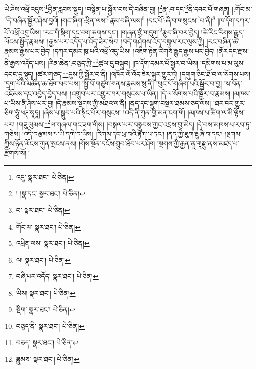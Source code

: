 ཡེ་ཤེས་འཕྲོ་འདུས་\footnote{འདུ་  སྣར་ཐང་།  པེ་ཅིན། }བྱིན་རླབས་སྡུད། །བསྙེན་པ་སྐྱོལ་བས་དེ་བཞིན་བྱ། །\footnote{། །སྣ་དང་  སྣར་ཐང་།  པེ་ཅིན། }རྣ་:བ་དང་\footnote{བ་  སྣར་ཐང་།  པེ་ཅིན། }ནི་དབང་པོ་གཞན། །:གོང་མ་\footnote{གོང་ལ་  སྣར་ཐང་།  པེ་ཅིན། }དེ་བཞིན་སྦྱོར་ཤེས་བྱའོ། །གང་ཞིག་:ཕྲིན་ལས་\footnote{འཕྲིན་ལས་  སྣར་ཐང་།  པེ་ཅིན། }རྣམ་བཞི་ལས།\footnote{ལ།  སྣར་ཐང་།  པེ་ཅིན། } །དང་པོ་:ཞི་བ་གསུངས་\footnote{བཞི་པར་འདོད་  སྣར་ཐང་།  པེ་ཅིན། }པ་ནི།\footnote{ཡིས།  སྣར་ཐང་།  པེ་ཅིན། } །ཁ་དོག་དཀར་པོ་འཕྲོ་འདུ་ཡིས། །རང་གི་སྡིག་དང་བག་ཆགས་དང་། །གཞན་གྱི་གདུག་\footnote{སྡིག་  སྣར་ཐང་།  པེ་ཅིན། }རྩུབ་ཞི་བར་བྱེད། །ཚེ་རིང་རིགས་རྒྱུད་ལོངས་སྤྱོད་རྣམས། །རྒྱས་པར་འདོད་པ་འོད་ཟེར་སེར། །བདེ་གཤེགས་འོད་བསྐུལ་རང་ལུས་ཀྱི། །རང་བཞིན་ཚེ་རྣམས་རྒྱས་པར་བྱེད། །དཀར་དམར་ཁུ་པའི་འཕྲོ་འདུ་ཡིས། །འཇིག་རྟེན་རིགས་རྒྱུད་རྒྱས་པར་བྱེད། །ནོར་དང་རྫས་ནི་རྒྱས་འདོད་པས། །རིན་ཆེན་:བཅུད་ཀྱི་\footnote{བཅུད་ནི་  སྣར་ཐང་།  པེ་ཅིན། }ཚུལ་དུ་བསྒྲུབ། །ཁ་དོག་དམར་པོ་སྦྱར་བ་ཡིས། །དམིགས་པ་མ་ལུས་དབང་དུ་སྡུད། །ཚར་གཅད་\footnote{བཅད་  སྣར་ཐང་།  པེ་ཅིན། }དུས་ཀྱི་སྦྱོར་བ་ནི། །འཁོར་ལོ་འོད་ཟེར་སྐུར་གྱུར་ཏེ། །དགུག་ཅིང་ཐོ་བ་ལ་སོགས་པས། །དྲག་པོའི་མཚོན་ཆ་ཐོག་ཕབ་པས། །སྤྱི་བོ་གཙུག་གནས་རྣམས་སུ་ནི། །ཕུང་པོ་གཞིག་པའི་སྦྱོར་བ་བྱ། །ས་བོན་འཇོམས་དང་འབྱེད་བྱེད་པས། །འགྲུབ་པར་འགྱུར་བར་གསུངས་པ་ཡིན། །དེ་ལ་སོགས་པའི་སྦྱོར་བ་རྣམས། །མཁས་པ་ཡིས་ནི་ཤེས་པར་བྱ། །དེ་རྣམས་སྔགས་ཀྱི་མཐའ་ལ་ནི། །ནད་དང་སྡུག་བསྔལ་ཐམས་ཅད་ལས། །ཐར་བར་གྱུར་ཅིག་ཧཱུཾ་ཕཊ་སྭཱཧཱ། །ཞེས་པ་སྒྲུབ་པའི་སྙིང་པོར་གསུངས། །འདི་ནི་ཀུན་གྱི་མན་ངག་གོ། །མཁས་པ་ཚིག་ལ་མི་ལྟོས་པར། །གཟུ་ལུམས་\footnote{ཟླུམས་  སྣར་ཐང་།  པེ་ཅིན། }ལ་གཞལ་གང་ཟག་གིས། །བསྐལ་པར་བསྒྲུབས་ཀྱང་འབྲས་བུ་མེད། །དེ་བས་མཁས་པ་རབ་ཏུ་གཅེས། །འདི་བརྩམས་པ་ཡི་དགེ་བ་ཡིས། །རིགས་དང་ཕྲ་བའི་རྟོག་པ་དང་། །ནད་ཀྱི་ཟུག་རྔུ་ཞི་བ་དང་། །སྔགས་ཀྱིས་ཉོན་མོངས་ཀུན་སྤངས་ནས། །གོས་སྔོན་དངོས་གྲུབ་ཐོབ་པར་ཤོག །སྔགས་ཀྱི་རྒྱན་ནཱ་གཱརྫུ་ནས་མཛད་པ་རྫོགས་སོ། ། 